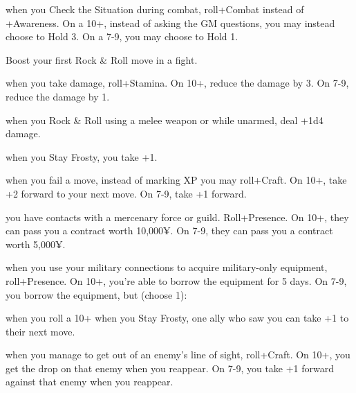 \newpage

\begin{dossier}
\hspace{.5cm}%
\vrule width 2pt
\hspace{.3cm}%
\begin{dossiermovebar}
\fontsize{9pt}{1em}\selectfont
\setlength{\parskip}{.2cm}

 when you Check the Situation during combat, roll+Combat instead of
+Awareness. On a 10+, instead of asking the GM questions, you may instead choose to Hold
3. On a 7-9, you may choose to Hold 1.
\begin{moveoptions}
\end{moveoptions}
 Boost your first Rock \& Roll move in a fight.

 when you take damage, roll+Stamina. On 10+, reduce the damage by 3.
On 7-9, reduce the damage by 1.

 when you Rock \& Roll using a melee weapon or while unarmed,
deal +1d4 damage.

 when you Stay Frosty, you take +1.

 when you fail a move, instead of marking XP you may
roll+Craft. On 10+, take +2 forward to your next move. On 7-9, take +1 forward.

 you have contacts with a mercenary force or guild. Roll+Presence.
On 10+, they can pass you a contract worth 10,000¥. On 7-9, they can pass you a contract
worth 5,000¥.

 when you use your military connections to acquire military-only equipment,
roll+Presence. On 10+, you’re able to borrow the equipment for 5 days. On 7-9, you borrow
the equipment, but (choose 1):
\begin{moveoptions}


\end{moveoptions}
 when you roll a 10+ when you Stay Frosty, one ally who saw you can take +1
to their next move.

 when you manage to get out of an enemy’s line of sight, roll+Craft. On
10+, you get the drop on that enemy when you reappear. On 7-9, you take +1 forward
against that enemy when you reappear.

\end{dossiermovebar}%
\end{dossier}

